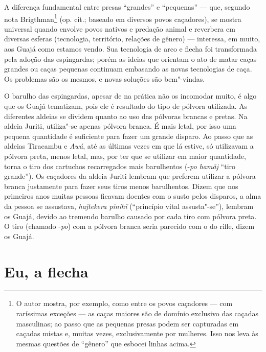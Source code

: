 A diferença fundamental entre presas ``grandes'' e ``pequenas'' --- que,
segundo nota Brigthman\footnote{O autor mostra, por exemplo, como entre
  os povos caçadores --- com raríssimas exceções --- as caças maiores são de
  domínio exclusivo das caçadas masculinas; ao passo que as pequenas
  presas podem ser capturadas em caçadas mistas e, muitas vezes,
  exclusivamente por mulheres. Isso nos leva às mesmas questões de
  ``gênero'' que esbocei linhas acima.} (op. cit.; baseado em diversos
povos caçadores), se mostra universal quando envolve povos nativos e
predação animal e reverbera em diversas esferas (tecnologia, território,
relações de gênero) --- interessa, em muito, aos Guajá como estamos vendo.
Sua tecnologia de arco e flecha foi transformada pela adoção das
espingardas; porém as ideias que orientam o ato de matar caças grandes
ou caças pequenas continuam embasando as novas tecnologias de caça. Os
problemas são os mesmos, e novas soluções são bem"-vindas.

O barulho das espingardas, apesar de na prática não os incomodar muito,
é algo que os Guajá tematizam, pois ele é resultado do tipo de pólvora
utilizada. As diferentes aldeias se dividem quanto ao uso das pólvoras
brancas e pretas. Na aldeia Juriti, utiliza"-se apenas pólvora branca. É
mais letal, por isso uma pequena quantidade é suficiente para fazer um
grande disparo. Ao passo que as aldeias Tiracambu e \emph{Awá}, até as
últimas vezes em que lá estive, só utilizavam a pólvora preta, menos
letal, mas, por ter que se utilizar em maior quantidade, torna o tiro
dos cartuchos recarregados mais barulhentos (-\emph{po hamãj} ``tiro
grande''). Os caçadores da aldeia Juriti lembram que preferem utilizar a
pólvora branca justamente para fazer seus tiros menos barulhentos. Dizem
que nos primeiros anos muitas pessoas ficavam doentes com o susto pelos
disparos, a alma da pessoa se assustava, \emph{hajtekera pinihĩ}
(``princípio vital assusta"-se''), lembram os Guajá, devido ao tremendo
barulho causado por cada tiro com pólvora preta. O tiro (chamado
-\emph{po}) com a pólvora branca seria parecido com o do rifle, dizem os
Guajá.

\section{Eu, a flecha}\label{eu-a-flecha}

